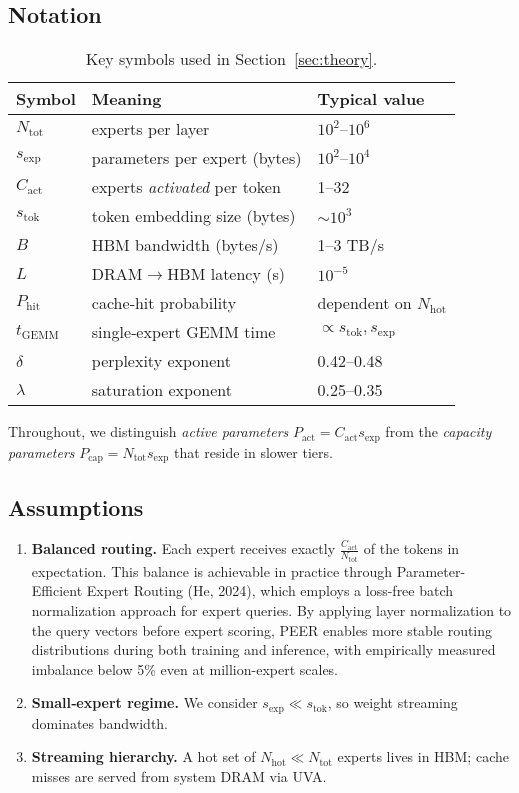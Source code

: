 \documentclass[11pt]{article}
\begin{document}
\subsection{Notation}
\begin{table}[ht]
  \centering
  \begin{tabular}{lll}
    \toprule
    Symbol & Meaning & Typical value \\
    \midrule
    $N_{\mathrm{tot}}$ & experts per layer & $10^2$--$10^6$ \\
    $s_{\mathrm{exp}}$ & parameters per expert (bytes) & $10^2$--$10^4$ \\
    $C_{\mathrm{act}}$ & experts \emph{activated} per token & 1--32 \\
    $s_{\mathrm{tok}}$ & token embedding size (bytes) & $\sim10^3$ \\
    $B$ & HBM bandwidth (bytes/s) & 1--3 TB/s \\
    $L$ & DRAM$\to$HBM latency (s) & $10^{-5}$ \\
    $P_{\mathrm{hit}}$ & cache‑hit probability & dependent on $N_{\mathrm{hot}}$ \\
    $t_{\mathrm{GEMM}}$ & single‑expert GEMM time & $\propto s_{\mathrm{tok}},s_{\mathrm{exp}}$ \\
    $\delta$ & perplexity exponent & 0.42--0.48 \\
    $\lambda$ & saturation exponent & 0.25--0.35 \\
    \bottomrule
  \end{tabular}
  \caption{Key symbols used in Section~\ref{sec:theory}.}
\end{table}

Throughout, we distinguish \emph{active parameters} $P_{\mathrm{act}} = C_{\mathrm{act}} s_{\mathrm{exp}}$ from the
\emph{capacity parameters} $P_{\mathrm{cap}} = N_{\mathrm{tot}} s_{\mathrm{exp}}$ that reside in slower tiers.

\subsection{Assumptions}
\begin{enumerate}
  \item \textbf{Balanced routing.} Each expert receives exactly $\frac{C_{\mathrm{act}}}{N_{\mathrm{tot}}}$ of the tokens in expectation. This balance is achievable in practice through Parameter-Efficient Expert Routing (He, 2024), which employs a loss-free batch normalization approach for expert queries. By applying layer normalization to the query vectors before expert scoring, PEER enables more stable routing distributions during both training and inference, with empirically measured imbalance below 5\% even at million-expert scales.
  \item \textbf{Small‑expert regime.} We consider $s_{\mathrm{exp}} \ll s_{\mathrm{tok}}$, so weight streaming dominates bandwidth.
  \item \textbf{Streaming hierarchy.} A hot set of $N_{\mathrm{hot}}\ll N_{\mathrm{tot}}$ experts lives in HBM; cache misses are served from system DRAM via UVA.
\end{enumerate}
\end{document}
